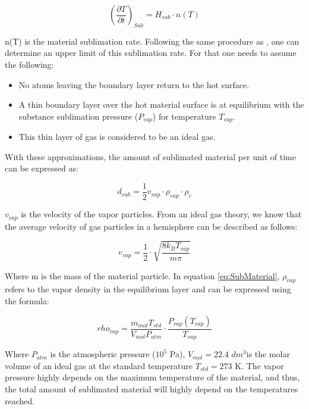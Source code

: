 \begin{equation}
    \left(\frac{\partial T}{\partial t}\right)_{Sub} = H_{sub}\cdot n(T)
\end{equation}

n(T) is the material sublimation rate. Following the same procedure as \parencite[][]{ref:SubRate}, one can determine an upper limit of this sublimation rate. For that one needs to assume the following: 

\begin{itemize}
    \item No atoms leaving the boundary layer return to the hot surface. 
    \item A thin boundary layer over the hot material surface is at equilibrium with the substance sublimation pressure ($P_{vap}$) for temperature $T_{vap}$. 
    \item This thin layer of gas is considered to be an ideal gas. 
\end{itemize}

With these approximations, the amount of sublimated material per unit of time can be expressed as: 

\begin{equation}
    d_{sub} = \frac{1}{2}v_{vap}\cdot \rho_{vap} \cdot \rho_{c}
    \label{eq:SubMaterial}
\end{equation}

$v_{vap}$ is the velocity of the vapor particles. From an ideal gas theory, we know that the average velocity of gas particles in a hemisphere can be described as follows: 

\begin{equation}
    v_{vap} = \frac{1}{2}\cdot \sqrt{\frac{8k_B T_{vap}}{m \pi}}
\end{equation}

Where m is the mass of the material particle. In equation \ref{eq:SubMaterial}, $\rho_{vap}$ refers to the vapor density in the equilibrium layer and can be expressed using the formula: 

\begin{equation}
    rho_{vap} = \frac{m_{mol} T_{std}}{V_{mol} P_{atm}}\cdot \frac{P_{vap}(T_{vap})}{T_{vap}}
\end{equation}

Where $P_{atm}$ is the atmospheric pressure ($10^5$ Pa), $V_{mol} = 22.4$ $dm^3$is the molar volume of an ideal gas at the standard temperature $T_{std} = 273$ K. The vapor pressure highly depends on the maximum temperature of the material, and thus, the total amount of sublimated material will highly depend on the temperatures reached. 

